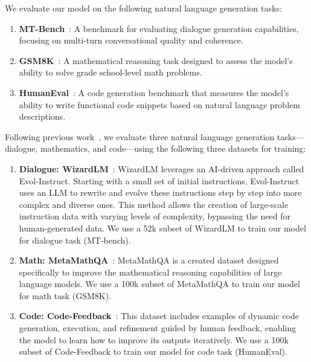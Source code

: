 We evaluate our model on the following natural language generation tasks:  

\begin{enumerate}
\item \textbf{MT-Bench}~\cite{zheng2023judging}: A benchmark for evaluating dialogue generation capabilities, focusing on multi-turn conversational quality and coherence.  
\item \textbf{GSM8K}~\cite{cobbe2021training}: A mathematical reasoning task designed to assess the model's ability to solve grade school-level math problems.  
\item \textbf{HumanEval}~\cite{chen2021evaluating}: A code generation benchmark that measures the model's ability to write functional code snippets based on natural language problem descriptions.
\end{enumerate}

Following previous work~\cite{wanglora}, we evaluate three natural language generation tasks—dialogue, mathematics, and code—using the following three datasets for training:
\begin{enumerate}
\item \textbf{Dialogue: WizardLM}~\cite{xu2023wizardlm}: WizardLM leverages an AI-driven approach called Evol-Instruct. Starting with a small set of initial instructions, Evol-Instruct uses an LLM to rewrite and evolve these instructions step by step into more complex and diverse ones. This method allows the creation of large-scale instruction data with varying levels of complexity, bypassing the need for human-generated data. We use a 52k subset of WizardLM to train our model for dialogue task (MT-bench).
\item \textbf{Math: MetaMathQA}~\cite{yumetamath}:  MetaMathQA is a created dataset designed specifically to improve the mathematical reasoning capabilities of large language models. We use a 100k subset of MetaMathQA to train our model for math task (GSM8K).
\item \textbf{Code: Code-Feedback}~\cite{zheng2024opencodeinterpreter}: This dataset includes examples of dynamic code generation, execution, and refinement guided by human feedback, enabling the model to learn how to improve its outputs iteratively. We use a 100k subset of Code-Feedback to train our model for code task (HumanEval).
\end{enumerate}

